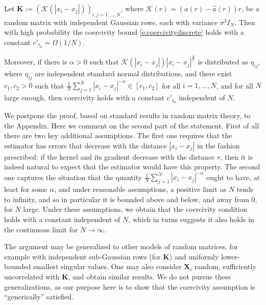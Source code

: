 \begin{proposition}
Let $\mathbf{K}:=(\mathcal K(|x_i-x_j|))_{i,j=1,\dots,N}$, where $\mathcal K(r)=(a(r)- \widehat a(r))r$,  be a random matrix with independent Gaussian rows, each with variance $\sigma^2I_N$. Then with high probability the coercivity bound \eqref{e:coercivitydiscrete} holds with a constant $c'_{t_0}=\Omega(1/N)$.

Moreover, if there is $\alpha>0$ such that $\mathcal{K}(|x_i-x_j|)|x_i-x_j|^\frac\alpha2$ is distributed as $\eta_{ij}$, where $\eta_{ij}$ are independent standard normal distributions, and there exist $c_1,c_2>0$ such that $\frac1N\sum_{j=1}^N|x_i-x_j|^{-\alpha}\in[c_1,c_2]$ for all $i=1,\dots,N$, and for all $N$ large enough, then coercivity holds with a constant $c'_{t_0}$ independent of $N$.
\label{p:randomcoercivity}
\end{proposition}
We postpone the proof, based on standard results in random matrix theory, to the Appendix.
Here we comment on the second part of the statement. First of all there are two key additional assumptions. The first one requires that the estimator has errors that decrease with the distance $|x_i-x_j|$ in the fashion prescribed: if the kernel and its gradient decrease with the distance $r$, then it is indeed natural to expect that the estimator would have this property. The second one captures the situation that the quantity $\frac1N\sum_{j=1}^N|x_i-x_j|^{-\alpha}$ ought to have, at least for some $\alpha$, and under reasonable assumptions, a positive limit as $N$ tends to infinity, and so in particular it is bounded above and below, and away from $0$, for $N$ large. 
Under these assumptions, we obtain that the coercivity condition holds with a constant independent of $N$, which in turns suggests it also holds in the continuous limit  {for $N \to \infty$}.

The argument  may be generalized to other models of random matrices, for example with independent sub-Gaussian rows (for $\mathbf{K}$) and uniformly lower-bounded smallest singular values. One may also consider $\mathbf{X}_i$ random, sufficiently uncorrelated with $\mathbf{K}$, and obtain similar results. We do not pursue these generalizations, as our purpose here is to show that the coercivity assumption is  ``generically'' satisfied.

